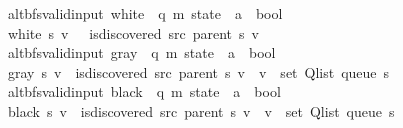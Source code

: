 \begin{isabellebody}
\isanewline
{}\isamarkupfalse%
\ {\isacharparenleft}{\kern0pt}\ alt{\isacharunderscore}{\kern0pt}bfs{\isacharunderscore}{\kern0pt}valid{\isacharunderscore}{\kern0pt}input{\isacharparenright}{\kern0pt}\ white\ {\isacharcolon}{\kern0pt}{\isacharcolon}{\kern0pt}\ {\isachardoublequoteopen}{\isacharparenleft}{\kern0pt}{\isacharprime}{\kern0pt}q{\isacharcomma}{\kern0pt}\ {\isacharprime}{\kern0pt}m{\isacharparenright}{\kern0pt}\ state\ {\isasymRightarrow}\ {\isacharprime}{\kern0pt}a\ {\isasymRightarrow}\ bool{\isachardoublequoteclose}\ \isanewline
\ \ {\isachardoublequoteopen}white\ s\ v\ {\isasymequiv}\ {\isasymnot}\ is{\isacharunderscore}{\kern0pt}discovered\ src\ {\isacharparenleft}{\kern0pt}parent\ s{\isacharparenright}{\kern0pt}\ v{\isachardoublequoteclose}\isanewline
\isanewline
{}\isamarkupfalse%
\ {\isacharparenleft}{\kern0pt}\ alt{\isacharunderscore}{\kern0pt}bfs{\isacharunderscore}{\kern0pt}valid{\isacharunderscore}{\kern0pt}input{\isacharparenright}{\kern0pt}\ gray\ {\isacharcolon}{\kern0pt}{\isacharcolon}{\kern0pt}\ {\isachardoublequoteopen}{\isacharparenleft}{\kern0pt}{\isacharprime}{\kern0pt}q{\isacharcomma}{\kern0pt}\ {\isacharprime}{\kern0pt}m{\isacharparenright}{\kern0pt}\ state\ {\isasymRightarrow}\ {\isacharprime}{\kern0pt}a\ {\isasymRightarrow}\ bool{\isachardoublequoteclose}\ \isanewline
\ \ {\isachardoublequoteopen}gray\ s\ v\ {\isasymequiv}\ is{\isacharunderscore}{\kern0pt}discovered\ src\ {\isacharparenleft}{\kern0pt}parent\ s{\isacharparenright}{\kern0pt}\ v\ {\isasymand}\ v\ {\isasymin}\ set\ {\isacharparenleft}{\kern0pt}Q{\isacharunderscore}{\kern0pt}list\ {\isacharparenleft}{\kern0pt}queue\ s{\isacharparenright}{\kern0pt}{\isacharparenright}{\kern0pt}{\isachardoublequoteclose}\isanewline
\isanewline
{}\isamarkupfalse%
\ {\isacharparenleft}{\kern0pt}\ alt{\isacharunderscore}{\kern0pt}bfs{\isacharunderscore}{\kern0pt}valid{\isacharunderscore}{\kern0pt}input{\isacharparenright}{\kern0pt}\ black\ {\isacharcolon}{\kern0pt}{\isacharcolon}{\kern0pt}\ {\isachardoublequoteopen}{\isacharparenleft}{\kern0pt}{\isacharprime}{\kern0pt}q{\isacharcomma}{\kern0pt}\ {\isacharprime}{\kern0pt}m{\isacharparenright}{\kern0pt}\ state\ {\isasymRightarrow}\ {\isacharprime}{\kern0pt}a\ {\isasymRightarrow}\ bool{\isachardoublequoteclose}\ \isanewline
\ \ {\isachardoublequoteopen}black\ s\ v\ {\isasymequiv}\ is{\isacharunderscore}{\kern0pt}discovered\ src\ {\isacharparenleft}{\kern0pt}parent\ s{\isacharparenright}{\kern0pt}\ v\ {\isasymand}\ v\ {\isasymnotin}\ set\ {\isacharparenleft}{\kern0pt}Q{\isacharunderscore}{\kern0pt}list\ {\isacharparenleft}{\kern0pt}queue\ s{\isacharparenright}{\kern0pt}{\isacharparenright}{\kern0pt}{\isachardoublequoteclose}\isanewline

\end{isabellebody}
